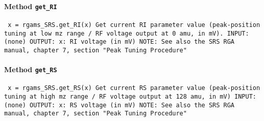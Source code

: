 \paragraph{Method \texttt{get_RI}}
\vspace{1ex}
\texttt{\newline
x = rgams_SRS.get_RI(x)\newline
\newline
Get current RI parameter value (peak-position tuning at low mz range / RF voltage output at 0 amu, in mV).\newline
\newline
INPUT:\newline
(none)\newline
\newline
OUTPUT:\newline
x: RI voltage (in mV)\newline
\newline
NOTE:\newline
See also the SRS RGA manual, chapter 7, section "Peak Tuning Procedure"\newline
\newline
}

\paragraph{Method \texttt{get_RS}}
\vspace{1ex}
\texttt{\newline
x = rgams_SRS.get_RS(x)\newline
\newline
Get current RS parameter value (peak-position tuning at high mz range  / RF voltage output at 128 amu, in mV)\newline
\newline
INPUT:\newline
(none)\newline
\newline
OUTPUT:\newline
x: RS voltage (in mV)\newline
\newline
NOTE:\newline
See also the SRS RGA manual, chapter 7, section "Peak Tuning Procedure"\newline
\newline
}

